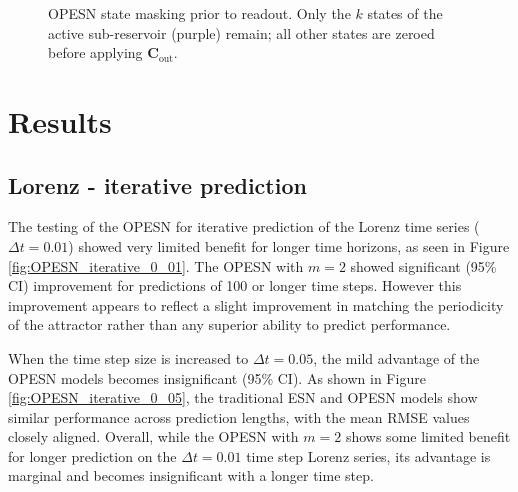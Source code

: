 \begin{figure}
    \caption{OPESN state masking prior to readout. Only the $k$ states of the active sub-reservoir (purple) remain; all other states are zeroed before applying $\mathbf{C}_{\text{out}}$.}
    \label{fig:OPESN_masked_states}
\end{figure}

\section{Results}

\subsection{Lorenz - iterative prediction}

The testing of the OPESN for iterative prediction of the Lorenz time series ($\Delta t=0.01$) showed very limited benefit for longer time horizons, as seen in Figure \ref{fig:OPESN_iterative_0_01}. The OPESN with $m=2$ showed significant (95\% CI) improvement for predictions of 100 or longer time steps. However this improvement appears to reflect a slight improvement in matching the periodicity of the attractor rather than any superior ability to predict performance.

When the time step size is increased to $\Delta t=0.05$, the mild advantage of the OPESN models becomes insignificant (95\% CI). As shown in Figure \ref{fig:OPESN_iterative_0_05}, the traditional ESN and OPESN models show similar performance across prediction lengths, with the mean RMSE values closely aligned. Overall, while the OPESN with $m=2$ shows some limited benefit for longer prediction on the $\Delta t=0.01$ time step Lorenz series, its advantage is marginal and becomes insignificant with a longer time step.


